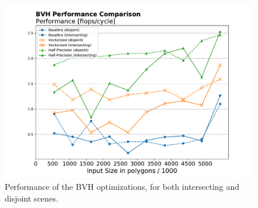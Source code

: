 \documentclass[twocolumn]{article}
\newcommand{\mypar}[1]{{\bf #1.}}
\begin{document}
\begin{figure}[!ht]
\includegraphics[width=1.1\linewidth]{bvh_performance.pdf}
\caption{Performance of the BVH optimizations, for both intersecting and disjoint scenes.}
\label{bvhperformance}
\end{figure}







\end{document}
